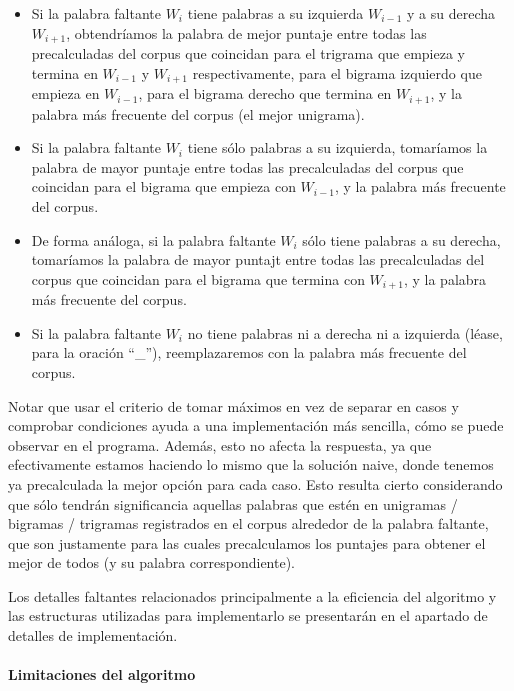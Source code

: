 \documentclass[a4paper]{article}
\begin{document}
\begin{enumerate}
        \begin{itemize}
            \item Si la palabra faltante $W_i$ tiene palabras a su izquierda $W_{i-1}$ y a su derecha $W_{i+1}$, obtendríamos la palabra de mejor puntaje entre todas las precalculadas del corpus que coincidan para el trigrama que empieza y termina en $W_{i-1}$ y $W_{i+1}$ respectivamente, para el bigrama izquierdo que empieza en $W_{i-1}$, para el bigrama derecho que termina en $W_{i+1}$, y la palabra más frecuente del corpus (el mejor unigrama).
            \item Si la palabra faltante $W_i$ tiene sólo palabras a su izquierda, tomaríamos la palabra de mayor puntaje entre todas las precalculadas del corpus que coincidan para el bigrama que empieza  con $W_{i-1}$, y la palabra más frecuente del corpus.
            \item De forma análoga, si la palabra faltante $W_i$ sólo tiene palabras a su derecha, tomaríamos la palabra de mayor puntajt entre todas las precalculadas del corpus que coincidan para el bigrama que termina con $W_{i+1}$, y la palabra más frecuente del corpus.
            \item Si la palabra faltante $W_i$ no tiene palabras ni a derecha ni a izquierda (léase, para la oración ``\_''), reemplazaremos con la palabra más frecuente del corpus.
        \end{itemize}

        Notar que usar el criterio de tomar máximos en vez de separar en casos y comprobar condiciones ayuda a una implementación más sencilla, cómo se puede observar en el programa. Además, esto no afecta la respuesta, ya que efectivamente estamos haciendo lo mismo que la solución naive, donde tenemos ya precalculada la mejor opción para cada caso. Esto resulta cierto considerando que sólo tendrán significancia aquellas palabras que estén en unigramas / bigramas / trigramas registrados en el corpus alrededor de la palabra faltante, que son justamente para las cuales precalculamos los puntajes para obtener el mejor de todos (y su palabra correspondiente).
\end{enumerate}

Los detalles faltantes relacionados principalmente a la eficiencia del algoritmo y las estructuras utilizadas para implementarlo se presentarán en el apartado de detalles de implementación.

\paragraph{Limitaciones del algoritmo}
\end{document}
